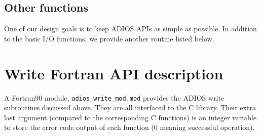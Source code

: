 \subsection{Other functions}

One of our design goals is to keep ADIOS APIs as simple as possible. In addition 
to the basic I/O functions, we provide another routine listed below. 

%
%
%
%
%
%


\section{Write Fortran API description}
\label{section:write_fortran_api}

A Fortran90 module, \verb+adios_write_mod.mod+ provides the ADIOS write 
subroutines discussed above. 
They are all interfaced to the C library. Their extra last argument 
(compared to the corresponding C functions) is an integer variable to store 
the error code output of each function (0 meaning successful operation). 

